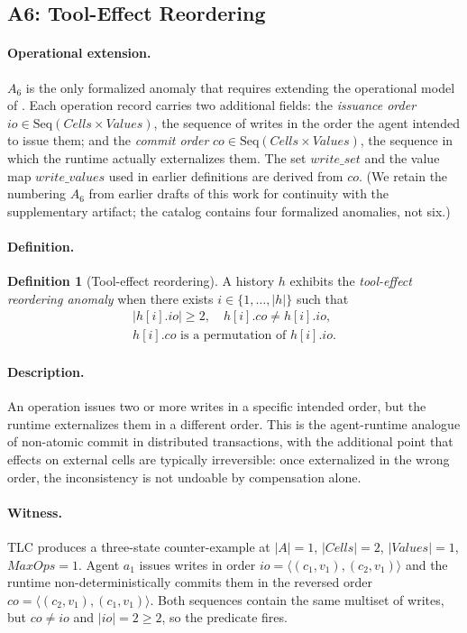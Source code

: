 \documentclass[journal,compsoc,10pt]{IEEEtran}
\theoremstyle{definition}
\newtheorem{anomaly}{Definition}
\theoremstyle{remark}
\newcommand{\fld}[1]{\mathit{#1}}
\newcommand{\ws}{\fld{write\_set}}
\newcommand{\wv}{\fld{write\_values}}
\begin{document}
\subsection{A6: Tool-Effect Reordering}
\label{sec:a6}
\paragraph{Operational extension.}
$A_6$ is the only formalized anomaly that requires extending the
operational model of . Each operation record
carries two additional fields: the \emph{issuance order}
$\fld{io} \in \mathrm{Seq}(\fld{Cells} \times \fld{Values})$, the
sequence of writes in the order the agent intended to issue them; and
the \emph{commit order} $\fld{co} \in \mathrm{Seq}(\fld{Cells} \times
\fld{Values})$, the sequence in which the runtime actually
externalizes them. The set $\ws$ and the value map $\wv$ used in
earlier definitions are derived from $\fld{co}$. (We retain the
numbering $A_6$ from earlier drafts of this work for continuity with
the supplementary artifact; the catalog contains four formalized
anomalies, not six.)

\paragraph{Definition.}
\begin{anomaly}[Tool-effect reordering]
\label{def:a6}
A history $h$ exhibits the \emph{tool-effect reordering anomaly} when
there exists $i \in \{1,\ldots,|h|\}$ such that
\[
  \begin{gathered}
  |h[i].\fld{io}| \geq 2,\quad h[i].\fld{co} \neq h[i].\fld{io},\\
  h[i].\fld{co} \text{ is a permutation of } h[i].\fld{io}.
  \end{gathered}
\]
\end{anomaly}

\paragraph{Description.}
An operation issues two or more writes in a specific intended order,
but the runtime externalizes them in a different order. This is the
agent-runtime analogue of non-atomic commit in distributed
transactions, with the additional point that effects on external
cells are typically irreversible: once externalized in the wrong
order, the inconsistency is not undoable by compensation alone.

\paragraph{Witness.}
TLC produces a three-state counter-example at $|A|=1$,
$|\fld{Cells}|=2$, $|\fld{Values}|=1$, $\fld{MaxOps}=1$. Agent $a_1$
issues writes in order $\fld{io} = \langle (c_1, v_1), (c_2, v_1)
\rangle$ and the runtime non-deterministically commits them in the
reversed order $\fld{co} = \langle (c_2, v_1), (c_1, v_1) \rangle$.
Both sequences contain the same multiset of writes, but $\fld{co}
\neq \fld{io}$ and $|\fld{io}| = 2 \geq 2$, so the predicate fires.
\end{document}
